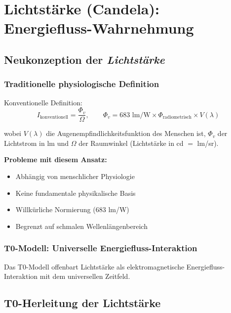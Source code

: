 	\section{Lichtstärke (Candela): Energiefluss-Wahrnehmung}
	\label{sec:candela_herleitung}
	
	\subsection{Neukonzeption der \textit{Lichtstärke}}
	\label{subsec:neukonzeption_lichtstaerke}
	
	\subsubsection{Traditionelle physiologische Definition}
	\label{subsubsec:traditionelle_lichtstaerke}
	
	Konventionelle Definition:
	\begin{equation}
		I_{\text{konventionell}} = \frac{\Phi_v}{\Omega}, \qquad \Phi_v = 683 \text{ lm/W} \times \Phi_{\text{radiometrisch}} \times V(\lambda)
		\label{eq:konventionelle_candela}
	\end{equation}
	
	wobei $V(\lambda)$ die Augenempfindlichkeitsfunktion des Menschen ist, $\Phi_v$ der Lichtstrom in lm und $\Omega$ der Raumwinkel (Lichtstärke in cd $=$ lm/sr).
	
	\textbf{Probleme mit diesem Ansatz:}
	\begin{itemize}
		\item Abhängig von menschlicher Physiologie
		\item Keine fundamentale physikalische Basis
		\item Willkürliche Normierung (683 lm/W)
		\item Begrenzt auf schmalen Wellenlängenbereich
	\end{itemize}
	
	\subsubsection{T0-Modell: Universelle Energiefluss-Interaktion}
	\label{subsubsec:t0_universeller_fluss}
	
	Das T0-Modell offenbart Lichtstärke als elektromagnetische Energiefluss-Interaktion mit dem universellen Zeitfeld.
	
	\subsection{T0-Herleitung der Lichtstärke}
	\label{subsec:t0_candela_herleitung}
	
